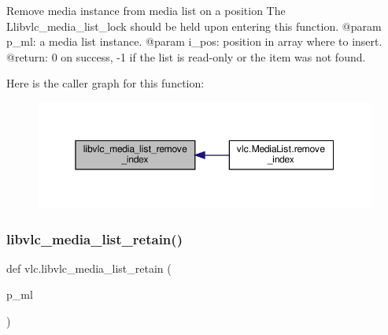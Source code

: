 \begin{DoxyVerb}Remove media instance from media list on a position
The L{libvlc_media_list_lock} should be held upon entering this function.
@param p_ml: a media list instance.
@param i_pos: position in array where to insert.
@return: 0 on success, -1 if the list is read-only or the item was not found.
\end{DoxyVerb}
 Here is the caller graph for this function\+:
\nopagebreak
\begin{figure}[H]
\begin{center}
\leavevmode
\includegraphics[width=350pt]{namespacevlc_a22579a827e1b9e58c69bac7de72b1ab7_icgraph}
\end{center}
\end{figure}
\mbox{\label{namespacevlc_a2261e153f34f4ba9fca2040530402c06}} 
\subsubsection{\texorpdfstring{libvlc\+\_\+media\+\_\+list\+\_\+retain()}{libvlc\_media\_list\_retain()}}
{\footnotesize\ttfamily def vlc.\+libvlc\+\_\+media\+\_\+list\+\_\+retain (\begin{DoxyParamCaption}\item[{}]{p\+\_\+ml }\end{DoxyParamCaption})}

